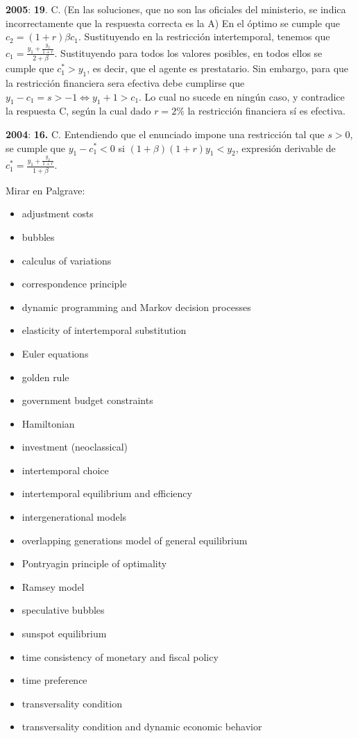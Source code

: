 \documentclass{nuevotema}
\begin{document}
\textbf{2005}: \textbf{19}. C. (En las soluciones, que no son las oficiales del ministerio, se indica incorrectamente que la respuesta correcta es la A) En el óptimo se cumple que $c_2 = (1+r) \beta c_1$. Sustituyendo en la restricción intertemporal, tenemos que $c_ 1 = \frac{ y_1 + \frac{y_2}{1+r}}{2+ \beta}$. Sustituyendo para todos los valores posibles, en todos ellos se cumple que $c_1^* > y_1$, es decir, que el agente es prestatario. Sin embargo, para que la restricción financiera sera efectiva debe cumplirse que $y_1 - c_1 = s > -1 \iff y_1+1>c_1$. Lo cual no sucede en ningún caso, y contradice la respuesta C, según la cual dado $r=2\%$ la restricción financiera sí es efectiva.

\textbf{2004}: \textbf{16.} C. Entendiendo que el enunciado impone una restricción tal que $s > 0$, se cumple que $y_1 - c_1^* < 0$ si $(1+\beta)(1+r) y_1 < y_2$, expresión derivable de $c_1^* = \frac{y_1 + \frac{y_2}{1+r}}{1+\beta}$.

\bibliografia

Mirar en Palgrave:
\begin{itemize}
    \item adjustment costs
    \item bubbles
    \item calculus of variations
    \item correspondence principle
    \item dynamic programming and Markov decision processes
    \item elasticity of intertemporal substitution
    \item Euler equations
    \item golden rule
    \item government budget constraints
    \item Hamiltonian
    \item investment (neoclassical)
    \item intertemporal choice
    \item intertemporal equilibrium and efficiency
    \item intergenerational models
    \item overlapping generations model of general equilibrium
    \item Pontryagin principle of optimality
    \item Ramsey model
    \item speculative bubbles
    \item sunspot equilibrium
    \item time consistency of monetary and fiscal policy
    \item time preference
    \item transversality condition
    \item transversality condition and dynamic economic behavior
\end{itemize}
\end{document}
